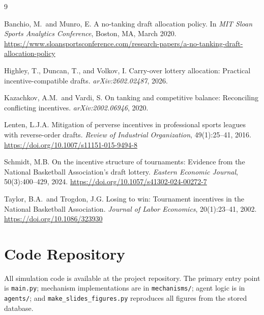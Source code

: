 \documentclass{article}
\begin{document}
\begin{thebibliography}{9}

Banchio, M.\ and Munro, E.
\newblock A no-tanking draft allocation policy.
\newblock In \textit{MIT Sloan Sports Analytics Conference}, Boston, MA,
March 2020.
\newblock \url{https://www.sloansportsconference.com/research-papers/a-no-tanking-draft-allocation-policy}

Highley, T., Duncan, T., and Volkov, I.
\newblock Carry-over lottery allocation: Practical incentive-compatible drafts.
\newblock \textit{arXiv:2602.02487}, 2026.

Kazachkov, A.M.\ and Vardi, S.
\newblock On tanking and competitive balance: Reconciling conflicting
incentives.
\newblock \textit{arXiv:2002.06946}, 2020.

Lenten, L.J.A.
\newblock Mitigation of perverse incentives in professional sports leagues with
reverse-order drafts.
\newblock \textit{Review of Industrial Organization}, 49(1):25--41, 2016.
\newblock \url{https://doi.org/10.1007/s11151-015-9494-8}

Schmidt, M.B.
\newblock On the incentive structure of tournaments: Evidence from the
National Basketball Association's draft lottery.
\newblock \textit{Eastern Economic Journal}, 50(3):400--429, 2024.
\newblock \url{https://doi.org/10.1057/s41302-024-00272-7}

Taylor, B.A.\ and Trogdon, J.G.
\newblock Losing to win: Tournament incentives in the National Basketball
Association.
\newblock \textit{Journal of Labor Economics}, 20(1):23--41, 2002.
\newblock \url{https://doi.org/10.1086/323930}

\end{thebibliography}


\appendix

\section{Code Repository}

All simulation code is available at the project repository.
The primary entry point is \texttt{main.py}; mechanism implementations are
in \texttt{mechanisms/}; agent logic is in \texttt{agents/}; and
\texttt{make\_slides\_figures.py} reproduces all figures from the stored
database.
\end{document}
